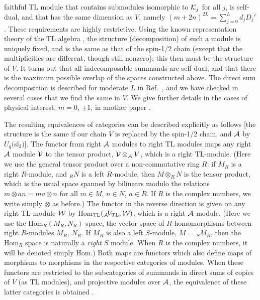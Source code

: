 \documentclass[twocolumn,floats,pra]{revtex4}
\def \cA {{\cal A}}
\begin{document}
faithful TL module that contains submodules isomorphic to ${\cal
K}_j$ for all $j$, is self-dual, and that has the same dimension
as $V$, namely $(m+2n)^{2L}=\sum_{j=0}^L d_j D_j'$. These
requirements are highly restrictive. Using the known
representation theory of the TL algebra \cite{martin}, the
structure (decomposition) of such a module is uniquely fixed, and
is the same as that of the spin-1/2 chain (except that the
multiplicities are different, though still nonzero); this then
must be the structure of $V$. It turns out that all indecomposable
summands are self-dual, and that there is the maximum possible
overlap of the spaces constructed above. The direct sum
decomposition is described for moderate $L$ in Ref.\
\cite{martin2}, and we have checked in several cases that we find
the same in $V$. We give further details in the cases of physical
interest, $m=0$, $\pm1$, in another paper \cite{rs3}.

The resulting equivalences of categories can be described
explicitly as follows \cite{lemma} [the structure is the same if
our chain $V$ is replaced by the spin-1/2 chain, and $\cA$ by
$U_q($sl$_2)$]. The functor from right $\cA$ modules to right TL
modules maps any right $\cA$ module $\cal V$ to the tensor
product, ${\cal V}\otimes_\cA V$, which is a right TL-module.
(Here we use the general tensor product over a non-commutative
ring $R$: if $M_R$ is a right $R$-module, and $_R N$ is a left
$R$-module, then $M\otimes_R N$ is the tensor product, which is
the usual space spanned by bilinears modulo the relations
$m\otimes an = ma\otimes n$ for all $m\in M$, $n\in N$, $a\in R$.
If $R$ is the complex numbers, we write simply $\otimes$ as
before.) The functor in the reverse direction is given on any
right TL-module $\cal W$ by Hom$_{\rm TL}(_\cA\!V_{\rm TL},{\cal
W})$, which is a right $\cA$ module. (Here we use the
Hom$_R(M_R,N_R)$ space, the vector space of $R$-homomorphisms
between right $R$-modules $M_R$, $N_R$. If $M_R$ is also a left
$S$-module, $M=\,_S\!M_R$, then the Hom$_R$ space is naturally a
{\em right} $S$ module. When $R$ is the complex numbers, it will
be denoted simply Hom.) Both maps are functors which also define
maps of morphisms to morphisms in the respective categories of
modules. When these functors are restricted to the subcategories
of summands in direct sums of copies of $V$ (as TL modules), and
projective modules over $\cA$, the equivalence of these latter
categories is obtained \cite{lemma}.
\end{document}
